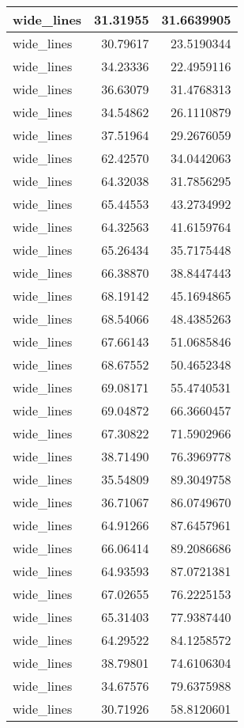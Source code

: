 \documentclass[
]{book}
\theoremstyle{definition}
\theoremstyle{definition}
\theoremstyle{definition}
\theoremstyle{definition}
\theoremstyle{remark}
\begin{document}
\begin{tabular}{l|r|r}
\hline
wide\_lines & 31.31955 & 31.6639905\\
\hline
wide\_lines & 30.79617 & 23.5190344\\
\hline
wide\_lines & 34.23336 & 22.4959116\\
\hline
wide\_lines & 36.63079 & 31.4768313\\
\hline
wide\_lines & 34.54862 & 26.1110879\\
\hline
wide\_lines & 37.51964 & 29.2676059\\
\hline
wide\_lines & 62.42570 & 34.0442063\\
\hline
wide\_lines & 64.32038 & 31.7856295\\
\hline
wide\_lines & 65.44553 & 43.2734992\\
\hline
wide\_lines & 64.32563 & 41.6159764\\
\hline
wide\_lines & 65.26434 & 35.7175448\\
\hline
wide\_lines & 66.38870 & 38.8447443\\
\hline
wide\_lines & 68.19142 & 45.1694865\\
\hline
wide\_lines & 68.54066 & 48.4385263\\
\hline
wide\_lines & 67.66143 & 51.0685846\\
\hline
wide\_lines & 68.67552 & 50.4652348\\
\hline
wide\_lines & 69.08171 & 55.4740531\\
\hline
wide\_lines & 69.04872 & 66.3660457\\
\hline
wide\_lines & 67.30822 & 71.5902966\\
\hline
wide\_lines & 38.71490 & 76.3969778\\
\hline
wide\_lines & 35.54809 & 89.3049758\\
\hline
wide\_lines & 36.71067 & 86.0749670\\
\hline
wide\_lines & 64.91266 & 87.6457961\\
\hline
wide\_lines & 66.06414 & 89.2086686\\
\hline
wide\_lines & 64.93593 & 87.0721381\\
\hline
wide\_lines & 67.02655 & 76.2225153\\
\hline
wide\_lines & 65.31403 & 77.9387440\\
\hline
wide\_lines & 64.29522 & 84.1258572\\
\hline
wide\_lines & 38.79801 & 74.6106304\\
\hline
wide\_lines & 34.67576 & 79.6375988\\
\hline
wide\_lines & 30.71926 & 58.8120601\\

\end{tabular}
\end{document}

